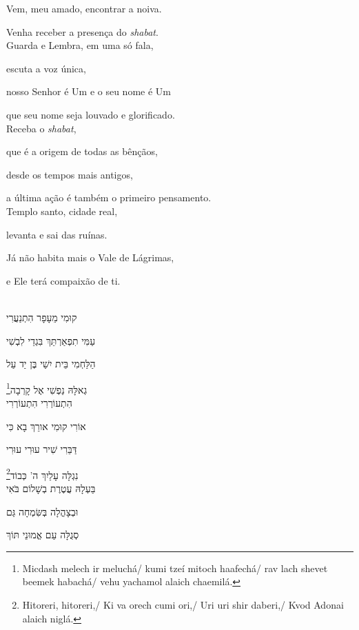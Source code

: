 Vem, {meu amado}, encontrar a noiva.\label{casamento}

Venha receber a presença do \emph{shabat}.\\[10pt]

{Guarda e Lembra}, em uma só fala,

escuta a voz única,

nosso Senhor é Um e o seu nome é Um

que seu nome seja louvado e glorificado.\\[10pt]

Receba o \emph{shabat},

que é a origem de todas as bênçãos,

desde os tempos mais antigos,

a última ação é também o primeiro pensamento.\\[10pt]

Templo santo, cidade real,

levanta e sai das ruínas.

Já não habita mais o Vale de Lágrimas,

e Ele terá compaixão de ti.\\[10pt]


\movetoevenpage
\raggedleft

\vspace*{1cm}

\textsc{}\\[15pt]

קוּמִי מֵעָפָר הִתְנַעֲרִי

עַמִּי תִפְאַרְתֵּךְ בִּגְדֵי לִבְשִׁי 

הַלַּחְמִי בֵּית יִשַׁי בֶּן יַד עַל

\footnote{Micdash melech ir meluchá/ kumi tzeí mitoch haafechá/ 
		rav lach shevet beemek habachá/ vehu yachamol alaich chaemilá.}גְאלָּהּ נַפְשִׁי אֶל קָרְבָה\\[10pt]

הִתְעוֹרְרִי הִתְעוֹרְרִי

אוֹרִי קוּמִי אורֵךְ בָא כִּי

דַּבֵּרִי שִׁיר עוּרִי עוּרִי

\footnote{Hitoreri, hitoreri,/ Ki va orech cumi ori,/ Uri uri shir daberi,/
Kvod Adonai alaich niglá.}נִגְלָּה עָלַיִךְ ה' כְּבוֹד\\[10pt]

בַּעְלָהּ עֲטֶרֶת בְשָׁלוֹם בֹּאִי

וּבְצָהֳלָה בְּשִּׂמְחָה גַּם 

סְגֻלָּה עַם אֱמוּנֵי תּוֹךְ 

